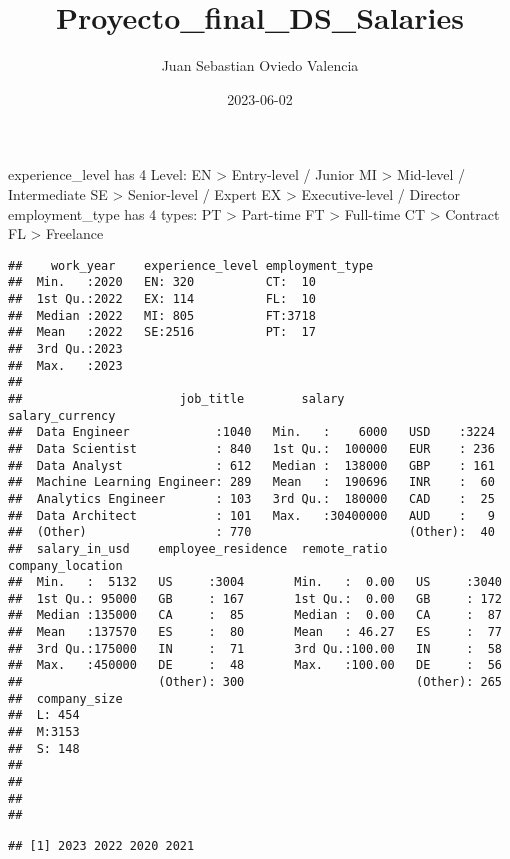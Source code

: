 \documentclass[
]{article}
\title{Proyecto\_final\_DS\_Salaries}
\author{Juan Sebastian Oviedo Valencia}
\date{2023-06-02}
\begin{document}
\maketitle

experience\_level has 4 Level: EN \textgreater{} Entry-level / Junior MI
\textgreater{} Mid-level / Intermediate SE \textgreater{} Senior-level /
Expert EX \textgreater{} Executive-level / Director employment\_type has
4 types: PT \textgreater{} Part-time FT \textgreater{} Full-time CT
\textgreater{} Contract FL \textgreater{} Freelance

\begin{verbatim}
##    work_year    experience_level employment_type
##  Min.   :2020   EN: 320          CT:  10        
##  1st Qu.:2022   EX: 114          FL:  10        
##  Median :2022   MI: 805          FT:3718        
##  Mean   :2022   SE:2516          PT:  17        
##  3rd Qu.:2023                                   
##  Max.   :2023                                   
##                                                 
##                      job_title        salary         salary_currency
##  Data Engineer            :1040   Min.   :    6000   USD    :3224   
##  Data Scientist           : 840   1st Qu.:  100000   EUR    : 236   
##  Data Analyst             : 612   Median :  138000   GBP    : 161   
##  Machine Learning Engineer: 289   Mean   :  190696   INR    :  60   
##  Analytics Engineer       : 103   3rd Qu.:  180000   CAD    :  25   
##  Data Architect           : 101   Max.   :30400000   AUD    :   9   
##  (Other)                  : 770                      (Other):  40   
##  salary_in_usd    employee_residence  remote_ratio    company_location
##  Min.   :  5132   US     :3004       Min.   :  0.00   US     :3040    
##  1st Qu.: 95000   GB     : 167       1st Qu.:  0.00   GB     : 172    
##  Median :135000   CA     :  85       Median :  0.00   CA     :  87    
##  Mean   :137570   ES     :  80       Mean   : 46.27   ES     :  77    
##  3rd Qu.:175000   IN     :  71       3rd Qu.:100.00   IN     :  58    
##  Max.   :450000   DE     :  48       Max.   :100.00   DE     :  56    
##                   (Other): 300                        (Other): 265    
##  company_size
##  L: 454      
##  M:3153      
##  S: 148      
##              
##              
##              
## 
\end{verbatim}

\begin{verbatim}
## [1] 2023 2022 2020 2021
\end{verbatim}
\end{document}
